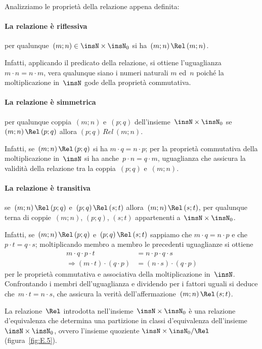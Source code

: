 Analizziamo le proprietà della relazione appena definita:

\paragraph{La relazione è riflessiva} per qualunque~$(m;n)\in \insN\times\insN_{0}$ si ha~$(m;n)\,\Rel\, (m;n)$.

Infatti, applicando il predicato della relazione, si ottiene l'uguaglianza~$m\cdot n=n\cdot m$, vera qualunque siano i numeri naturali
$m$ ed~$n$ poiché la moltiplicazione in~$\insN$ gode della proprietà commutativa.

\paragraph{La relazione è simmetrica} per qualunque coppia~$(m;n)$ e~$(p;q)$ dell'insieme~$\insN\times\insN_{0}$ se $(m;n)\,\Rel\, (p;q)$ allora $(p;q)\,Rel\, (m;n)$.

Infatti, se~$(m;n)\,\Rel\,(p;q)$ si ha  $m\cdot q=n\cdot p$; per la proprietà commutativa della moltiplicazione in~$\insN$ si ha anche~$p\cdot n=q\cdot m$,
uguaglianza che assicura la validità della relazione tra la coppia~$(p;q)$ e~$(m;n)$.

\paragraph{La relazione è transitiva} se~$(m;n)\,\Rel\, (p;q)$ e~$(p;q)\,\Rel\, (s;t)$ allora~$(m;n)\,\Rel\,(s;t)$, per qualunque terna di coppie~$(m;n)$, $(p;q)$, $(s;t)$ appartenenti a~$\insN\times\insN_{0}$.

Infatti, se~$(m;n)\,\Rel\, (p;q)$ e~$(p;q)\,\Rel\, (s;t)$ sappiamo che  $m\cdot q=n\cdot p$ e che~$p\cdot t=q\cdot s$;
moltiplicando membro a membro le precedenti uguaglianze si ottiene
\begin{align*}
m\cdot q\cdot p\cdot t&=n\cdot p\cdot q\cdot s\\
\Rightarrow (m\cdot t)\cdot (q\cdot p)&=(n\cdot s)\cdot (q\cdot p)
\end{align*}
per le proprietà commutativa e associativa
della moltiplicazione in~$\insN$. Confrontando i membri dell'uguaglianza e dividendo per i fattori uguali si deduce che~$m\cdot t=n\cdot s$,
che assicura la verità dell'affermazione~$(m;n)\,\Rel\, (s;t)$.

\conclusione La relazione~$\Rel$ introdotta nell'insieme~$\insN\times \insN_{0}$ è una relazione d'equivalenza che determina
una partizione in classi d'equivalenza dell'insieme~$\insN\times \insN_{0}$, ovvero l'insieme quoziente $\insN\times \insN_{0}/\Rel$ (figura~\ref{fig:E.5}).

